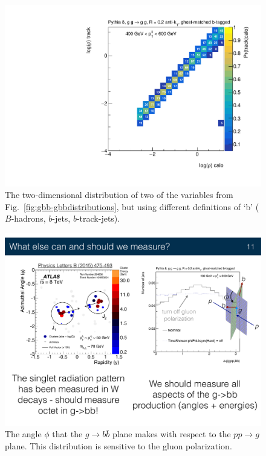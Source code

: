 \begin{figure}[htpb!]
\begin{center}
\includegraphics[width=0.45\linewidth]{figures/gbb/truth_level/rho_calo_track.pdf}
\caption{The two-dimensional distribution of two of the variables from Fig.~\ref{fig:gbb-gbbdistributions}, but using different definitions of `b' ($B$-hadrons, $b$-jets, $b$-track-jets).} 
\label{fig:gbb-gbbresponse}
\end{center}
\end{figure}

\begin{figure}[htpb!]
\begin{center}
\includegraphics[width=0.45\linewidth]{figures/gbb/truth_level/phi.pdf}
\caption{The angle $\phi$ that the $g\rightarrow b\bar{b}$ plane makes with respect to the $pp\rightarrow g$ plane.  This distribution is sensitive to the gluon polarization.} 
\label{fig:gbb-gbbangle}
\end{center}
\end{figure}

